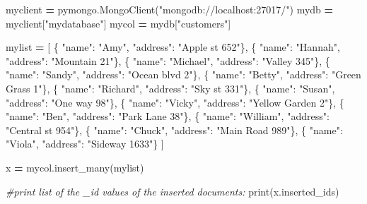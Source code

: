 \documentclass[
]{book}
\newenvironment{Shaded}{\begin{snugshade}}{\end{snugshade}}
\newcommand{\BuiltInTok}[1]{#1}
\newcommand{\CommentTok}[1]{\textcolor[rgb]{0.56,0.35,0.01}{\textit{#1}}}
\newcommand{\NormalTok}[1]{#1}
\newcommand{\OperatorTok}[1]{\textcolor[rgb]{0.81,0.36,0.00}{\textbf{#1}}}
\newcommand{\StringTok}[1]{\textcolor[rgb]{0.31,0.60,0.02}{#1}}
\begin{document}
\begin{Shaded}
\begin{Highlighting}[]
\NormalTok{myclient }\OperatorTok{=}\NormalTok{ pymongo.MongoClient(}\StringTok{"mongodb://localhost:27017/"}\NormalTok{)}
\NormalTok{mydb }\OperatorTok{=}\NormalTok{ myclient[}\StringTok{"mydatabase"}\NormalTok{]}
\NormalTok{mycol }\OperatorTok{=}\NormalTok{ mydb[}\StringTok{"customers"}\NormalTok{]}

\NormalTok{mylist }\OperatorTok{=}\NormalTok{ [}
\NormalTok{  \{ }\StringTok{"name"}\NormalTok{: }\StringTok{"Amy"}\NormalTok{, }\StringTok{"address"}\NormalTok{: }\StringTok{"Apple st 652"}\NormalTok{\},}
\NormalTok{  \{ }\StringTok{"name"}\NormalTok{: }\StringTok{"Hannah"}\NormalTok{, }\StringTok{"address"}\NormalTok{: }\StringTok{"Mountain 21"}\NormalTok{\},}
\NormalTok{  \{ }\StringTok{"name"}\NormalTok{: }\StringTok{"Michael"}\NormalTok{, }\StringTok{"address"}\NormalTok{: }\StringTok{"Valley 345"}\NormalTok{\},}
\NormalTok{  \{ }\StringTok{"name"}\NormalTok{: }\StringTok{"Sandy"}\NormalTok{, }\StringTok{"address"}\NormalTok{: }\StringTok{"Ocean blvd 2"}\NormalTok{\},}
\NormalTok{  \{ }\StringTok{"name"}\NormalTok{: }\StringTok{"Betty"}\NormalTok{, }\StringTok{"address"}\NormalTok{: }\StringTok{"Green Grass 1"}\NormalTok{\},}
\NormalTok{  \{ }\StringTok{"name"}\NormalTok{: }\StringTok{"Richard"}\NormalTok{, }\StringTok{"address"}\NormalTok{: }\StringTok{"Sky st 331"}\NormalTok{\},}
\NormalTok{  \{ }\StringTok{"name"}\NormalTok{: }\StringTok{"Susan"}\NormalTok{, }\StringTok{"address"}\NormalTok{: }\StringTok{"One way 98"}\NormalTok{\},}
\NormalTok{  \{ }\StringTok{"name"}\NormalTok{: }\StringTok{"Vicky"}\NormalTok{, }\StringTok{"address"}\NormalTok{: }\StringTok{"Yellow Garden 2"}\NormalTok{\},}
\NormalTok{  \{ }\StringTok{"name"}\NormalTok{: }\StringTok{"Ben"}\NormalTok{, }\StringTok{"address"}\NormalTok{: }\StringTok{"Park Lane 38"}\NormalTok{\},}
\NormalTok{  \{ }\StringTok{"name"}\NormalTok{: }\StringTok{"William"}\NormalTok{, }\StringTok{"address"}\NormalTok{: }\StringTok{"Central st 954"}\NormalTok{\},}
\NormalTok{  \{ }\StringTok{"name"}\NormalTok{: }\StringTok{"Chuck"}\NormalTok{, }\StringTok{"address"}\NormalTok{: }\StringTok{"Main Road 989"}\NormalTok{\},}
\NormalTok{  \{ }\StringTok{"name"}\NormalTok{: }\StringTok{"Viola"}\NormalTok{, }\StringTok{"address"}\NormalTok{: }\StringTok{"Sideway 1633"}\NormalTok{\}}
\NormalTok{]}

\NormalTok{x }\OperatorTok{=}\NormalTok{ mycol.insert\_many(mylist)}

\CommentTok{\#print list of the \_id values of the inserted documents:}
\BuiltInTok{print}\NormalTok{(x.inserted\_ids)}


\end{Highlighting}
\end{Shaded}
\end{document}
